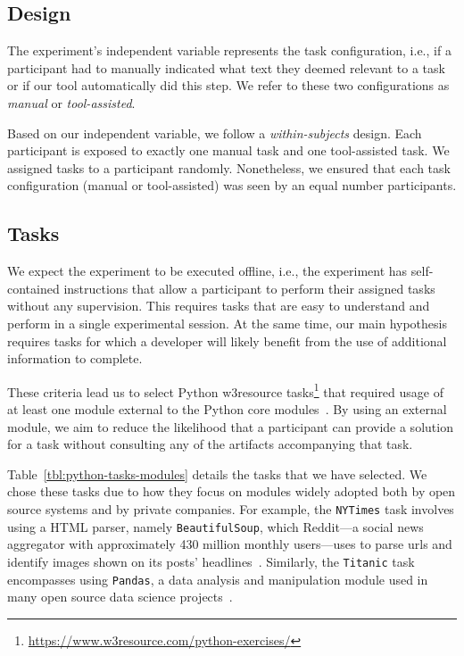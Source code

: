 \subsection{Design}


The experiment's independent variable represents the task configuration, i.e., if a participant had to manually indicated what text they deemed relevant to a task
or if our tool automatically did this step. We refer to these two configurations as \textit{manual} or \textit{tool-assisted}. 


Based on our independent variable, we follow a \textit{within-subjects} design. Each participant is exposed to exactly one manual task and one tool-assisted task.
We assigned tasks to a participant randomly. Nonetheless,  
we ensured that each task configuration (manual or tool-assisted) was seen by an equal number participants.








\subsection{Tasks}
\label{sec:experiment-tasks}



We expect the experiment to be executed offline, i.e., the experiment has self-contained instructions that allow a participant to perform their assigned tasks without any supervision.
This requires tasks that are easy to understand and perform in a single experimental session. At the same time, our main hypothesis requires tasks for which a developer will likely benefit from the use of additional information to complete.


These criteria lead us to select Python w3resource tasks\footnote{\url{https://www.w3resource.com/python-exercises/}}
that required usage of at least one module external to the Python core modules~\cite{thiselton2019}.
By using an external module, we aim to reduce the likelihood that a participant 
can provide a solution for a task without consulting any of the artifacts accompanying that task. 






Table~\ref{tbl:python-tasks-modules} details the tasks that we have selected. 
We chose these tasks due to how they focus on modules widely adopted both by open source systems and by private companies.
For example, the \texttt{NYTimes} task involves using a HTML parser, namely \texttt{BeautifulSoup},
which Reddit---a social news aggregator with approximately 430 million monthly users---uses 
to parse urls and identify images shown on its posts' headlines~\cite{bs4-reddit}. 
Similarly, the \texttt{Titanic} task encompasses using \texttt{Pandas}, a data analysis and manipulation module
used in many open source data science projects~\cite{ma2017, shrestha2020}.





